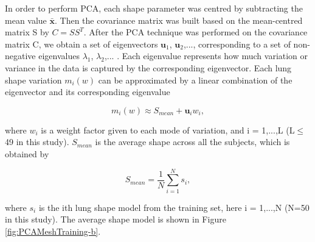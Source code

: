 {In order to perform PCA, each shape parameter was centred by subtracting the mean value $\mathbf{\bar{x}}$. Then the covariance matrix was built based on the mean-centred matrix S by $C = SS^T$. After the PCA technique was performed on the covariance matrix C, we obtain a set of eigenvectors $\mathbf{u}_1$, $\mathbf{u}_2$,..., corresponding to a set of non-negative eigenvalues $\lambda_1$, $\lambda_2$,... . Each eigenvalue represents how much variation or variance in the data is captured by the corresponding eigenvector. Each lung shape variation $m_i(w)$ can be approximated by a linear combination of the eigenvector and its corresponding eigenvalue

\begin{equation}
 \label{eq:PCAConstruction3}
 m_i(w) \approx S_{mean} + \mathbf{u}_i w_i,
\end{equation}

\noindent where $w_i$ is a weight factor given to each mode of variation, and i = 1,...,L (L$\leq$ 49 in this study). $S_{mean}$ is the average shape across all the subjects, which is obtained by

\begin{equation}
 \label{eq:PCAConstruction4}
 S_{mean} = \frac{1}{N}\sum_{i=1}^N s_i,
\end{equation}

 \noindent where $s_i$ is the ith lung shape model from the training set, here i = 1,...,N (N=50 in this study). The average shape model is shown in Figure \ref{fig:PCAMeshTraining-b}.

}
